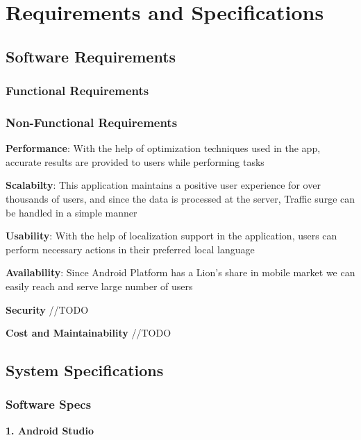 \documentclass[../Report.tex]{subfiles}
\begin{document}
\chapter{Requirements and  Specifications}

\section{Software Requirements}

\subsection{Functional Requirements}

\subsection{Non-Functional Requirements}
\textbf{Performance}:
With the help of optimization techniques used in the app, accurate results are provided to users while performing
tasks\par

\textbf{Scalabilty}:
This application maintains a positive user experience for over thousands of users, and since the data is processed
at the server, Traffic surge can be handled in a simple manner\par

\textbf{Usability}:
With the help of localization support in the application, users can perform necessary actions in their preferred
local language\par

\textbf{Availability}:
Since Android Platform has a Lion's share in mobile market we can easily reach and serve large number of users\par 

\textbf{Security}
  //TODO

\textbf{Cost and Maintainability}
 //TODO

 

\section{System Specifications}

\subsection{Software Specs}

\textbf{1. Android Studio}
\end{document}
